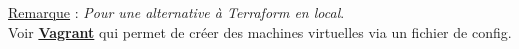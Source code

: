 \documentclass[a4paper,12pt,twoside]{article}
\newcommand{\urlcolor}{magenta}  %
\newcommand{\keycolor}{purple} %
\newcommand{\rem}[2]{\noindent\underline{Remarque} : \textit{#1}.\\ \indent #2}
\newcommand{\keyref}[2]{\hypersetup{urlcolor=\keycolor} \href{#1}{\textbf{#2}}\hypersetup{urlcolor=\urlcolor}}
\begin{document}
\rem{Pour une alternative à Terraform en local}{Voir \keyref{https://www.vagrantup.com/}{Vagrant} qui permet de créer des machines virtuelles via un fichier de config.}\\




\end{document}
